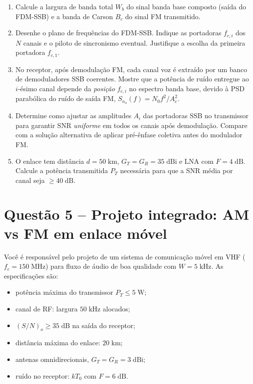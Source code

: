 \documentclass[11pt,a4paper]{article}
\begin{document}
\begin{enumerate}[label=\alph*)]
  \item Calcule a largura de banda total $W_b$ do sinal banda base composto (saída do FDM-SSB) e a banda de Carson $B_c$ do sinal FM transmitido.
  \item Desenhe o plano de frequências do FDM-SSB. Indique as portadoras $f_{c,i}$ dos $N$ canais e o piloto de sincronismo eventual. Justifique a escolha da primeira portadora $f_{c,1}$.
  \item No receptor, após demodulação FM, cada canal voz é extraído por um banco de demoduladores SSB coerentes. Mostre que a potência de ruído entregue ao $i$-ésimo canal depende da \emph{posição} $f_{c,i}$ no espectro banda base, devido à PSD parabólica do ruído de saída FM, $S_{n_o}(f) = N_0 f^2/A_c^2$.
  \item Determine como ajustar as amplitudes $A_i$ das portadoras SSB no transmissor para garantir SNR \emph{uniforme} em todos os canais após demodulação. Compare com a solução alternativa de aplicar pré-ênfase coletiva antes do modulador FM.
  \item O enlace tem distância $d = 50\;\text{km}$, $G_T = G_R = 35\;\text{dBi}$ e LNA com $F = 4\;\text{dB}$. Calcule a potência transmitida $P_T$ necessária para que a SNR média por canal seja $\ge 40\;\text{dB}$.
\end{enumerate}

\section*{Questão 5 -- Projeto integrado: AM vs FM em enlace móvel}

Você é responsável pelo projeto de um sistema de comunicação móvel em VHF ($f_c = 150\;\text{MHz}$) para fluxo de áudio de boa qualidade com $W = 5\;\text{kHz}$. As especificações são:

\begin{itemize}\itemsep0pt
  \item potência máxima do transmissor $P_T \le 5\;\text{W}$;
  \item canal de RF: largura $50\;\text{kHz}$ alocados;
  \item $(S/N)_o \ge 35\;\text{dB}$ na saída do receptor;
  \item distância máxima do enlace: $20\;\text{km}$;
  \item antenas omnidirecionais, $G_T = G_R = 3\;\text{dBi}$;
  \item ruído no receptor: $kT_0$ com $F = 6\;\text{dB}$.
\end{itemize}
\end{document}

